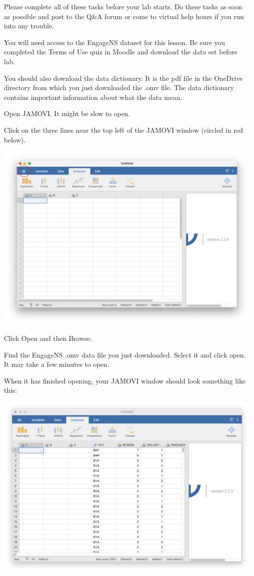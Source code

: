 \documentclass[
]{book}
\begin{document}
Please complete all of these tasks before your lab starts. Do these tasks as soon as possible and post to the Q\&A forum or come to virtual help hours if you run into any trouble.

You will need access to the EngageNS dataset for this lesson. Be sure you completed the Terms of Use quiz in Moodle and download the data set before lab.

You should also download the data dictionary. It is the pdf file in the OneDrive directory from which you just downloaded the .omv file. The data dictionary contains important information about what the data mean.

Open JAMOVI. It might be slow to open.

Click on the three lines near the top left of the JAMOVI window (circled in red below).

\includegraphics{img/3lines.png}

Click {Open} and then {Browse}.

Find the EngageNS .omv data file you just downloaded. Select it and click open. It may take a few minutes to open.

When it has finished opening, your JAMOVI window should look something like this:

\includegraphics{img/engagens_orig_data.png}
\end{document}
